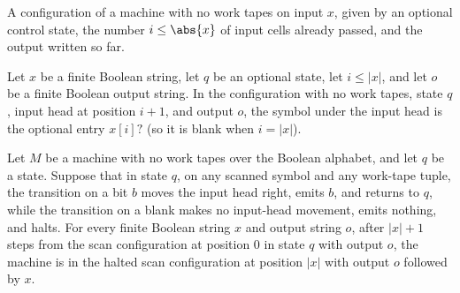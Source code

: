 \begin{definition}
\label{Turing.FinTM.scanCfg}
\leanok
{}
A configuration of a machine with no work tapes on input $x$, given by an
optional control state, the number $i \le \abs{x}$ of input cells already
passed, and the output written so far.
\end{definition}

\begin{lemma}
\label{Turing.FinTM.scanCfg_read}
\leanok
{}
Let $x$ be a finite Boolean string, let $q$ be an optional state, let $i\le |x|$, and
let $o$ be a finite Boolean output string. In the configuration with no work tapes,
state $q$, input head at position $i+1$, and output $o$, the symbol under the input head
is the optional entry $x[i]?$ (so it is blank when $i=|x|$).
\end{lemma}

\begin{lemma}
\label{Turing.FinTM.scanCopy_finish}
\leanok
{}
Let $M$ be a machine with no work tapes over the Boolean alphabet, and let $q$ be a
state. Suppose that in state $q$, on any scanned symbol and any work-tape tuple, the
transition on a bit $b$ moves the input head right, emits $b$, and returns to $q$, while
the transition on a blank makes no input-head movement, emits nothing, and halts. For
every finite Boolean string $x$ and output string $o$, after $|x|+1$ steps from the scan
configuration at position $0$ in state $q$ with output $o$, the machine is in the halted
scan configuration at position $|x|$ with output $o$ followed by $x$.
\end{lemma}

